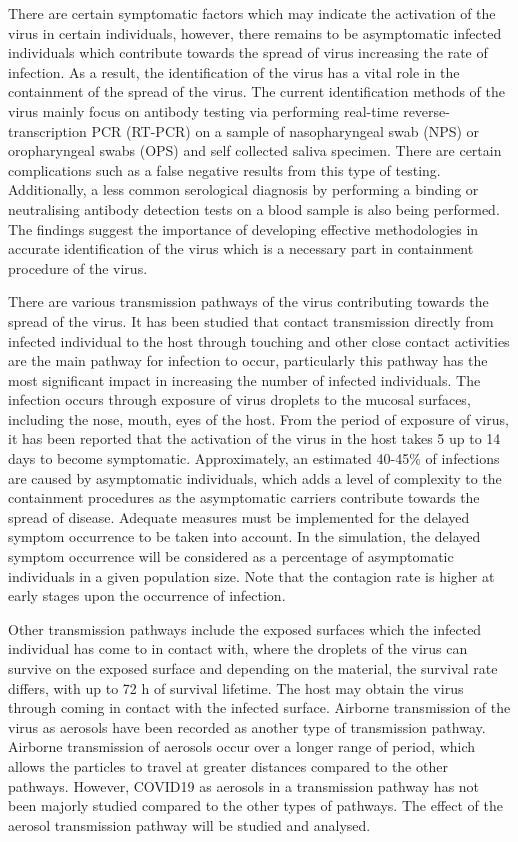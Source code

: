 \documentclass[11pt]{report}
\begin{document}
There are certain symptomatic factors which may indicate the activation of the virus in certain individuals, however, there remains to be asymptomatic infected individuals which contribute towards the spread of virus increasing the rate of infection.  As a result, the identification of the virus has a vital role in the containment of the spread of the virus. The current identification methods of the virus mainly focus on antibody testing via performing real-time reverse-transcription PCR (RT-PCR) on a sample of nasopharyngeal swab (NPS) or oropharyngeal swabs (OPS) and self collected saliva specimen. There are certain complications such as a false negative results from this type of testing. Additionally, a less common serological diagnosis by performing a binding or neutralising antibody detection tests on a blood sample is also being performed. The findings suggest the importance of developing effective methodologies in accurate identification of the virus which is a necessary part in containment procedure of the virus.

There are various transmission pathways of the virus contributing towards the spread of the virus. It has been studied that contact transmission directly from infected individual to the host through touching and other close contact activities are the main pathway for infection to occur, particularly this pathway has the most significant impact in increasing the number of infected individuals. The infection occurs through exposure of virus droplets to the mucosal surfaces, including the nose, mouth, eyes of the host. From the period of exposure of virus, it has been reported that the activation of the virus in the host takes 5 up to 14 days to become symptomatic. Approximately, an estimated 40-45\% of infections are caused by asymptomatic individuals, which adds a level of complexity to the containment procedures as the asymptomatic carriers contribute towards the spread of disease. Adequate measures must be implemented for the delayed symptom occurrence to be taken into account. In the simulation, the delayed symptom occurrence will be considered as a percentage of asymptomatic individuals in a given population size. Note that the contagion rate is higher at early stages upon the occurrence of infection.

Other transmission pathways include the exposed surfaces which the infected individual has come to in contact with, where the droplets of the virus can survive on the exposed surface and depending on the material, the survival rate differs, with up to 72 \si{\hour} of survival lifetime. The host may obtain the virus through coming in contact with the infected surface. Airborne transmission of the virus as aerosols have been recorded as another type of transmission pathway. Airborne transmission of aerosols occur over a longer range of period, which allows the particles to travel at greater distances compared to the other pathways. However, COVID19 as aerosols in a transmission pathway has not been majorly studied compared to the other types of pathways. The effect of the aerosol transmission pathway will be studied and analysed.
\end{document}
